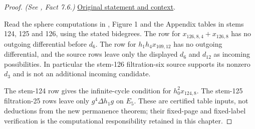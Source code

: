\begin{proof}
\textit{(See \cite{LWX126}, Fact 7.6.)} \href{paper/main.tex.html#L2156}{Original statement and context}.

Read the sphere computations in \cite{LWX126}, Figure 1 and the Appendix tables in stems 124, 125 and 126, using the stated bidegrees. The row for $x_{126,8,4}+x_{126,8}$ has no outgoing differential before $d_6$. The row for $h_1h_4x_{109,12}$ has no outgoing differential, and the source rows leave only the displayed $d_6$ and $d_{12}$ as incoming possibilities. In particular the stem-126 filtration-six source supports its nonzero $d_3$ and is not an additional incoming candidate.

The stem-124 row gives the infinite-cycle condition for $h_0^2x_{124,8}$. The stem-125 filtration-25 rows leave only $g^4\Delta h_1g$ on $E_5$. These are certified table inputs, not deductions from the new permanence theorem; their fixed-page and fixed-label verification is the computational responsibility retained in this chapter.
\end{proof}

